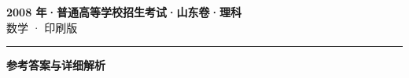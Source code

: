 \documentclass[zihao=5, a4paper]{ctexart}
\begin{document}
\begin{center}
  {\Large\bfseries 2008 年·普通高等学校招生考试·山东卷·理科}\\[4pt]
  {\large 数学 · 印刷版}
\end{center}
\medskip
{}

\par\bigskip\hrule\bigskip
{}
\begin{center}{\large\bfseries 参考答案与详细解析}\end{center}
\smallskip

\end{document}

